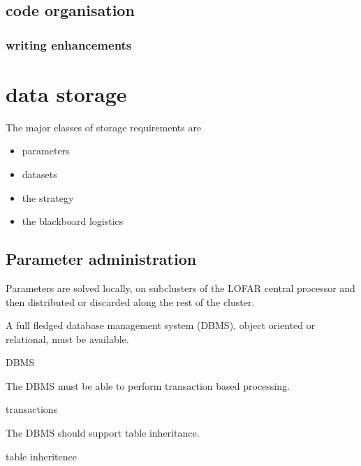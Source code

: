 \documentclass[]{lofar}
\begin{document}
    \subsection{code organisation}

      \subsubsection{writing enhancements}

  \section{data storage}
  \label{sec:data-storage}\hypertarget{sec:data-storage}{}

    The major classes of storage requirements are

    \begin{itemize}
      \item parameters
      \item datasets
      \item the strategy
      \item the blackboard logistics
    \end{itemize}

    \subsection{Parameter administration}
    \label{subsec:parameter-administration}\hypertarget{subsec:parameter-administration}{}

      Parameters are solved locally, on subclusters of the LOFAR
      central processor and then distributed or discarded along the
      rest of the cluster.

      \begin{prerequisite}
        A full fledged database management system (DBMS),
        object oriented or relational, must be available.
        \caption{DBMS\label{pre:dbms}}
      \end{prerequisite}

      \begin{prerequisite}
        The DBMS must be able to perform transaction based processing.
        \caption{transactions\label{pre:transactions}}
      \end{prerequisite}

      \begin{prerequisite}
        The DBMS should support table inheritance.
        \caption{table inheritence\label{pre:table-inheritance}}
      \end{prerequisite}
\end{document}
